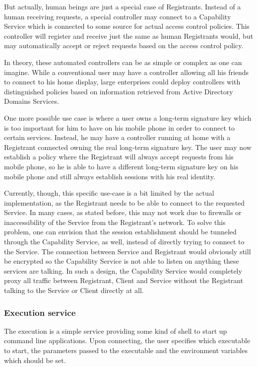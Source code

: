 But actually, human beings are just a special case of Registrants.
Instead of a human receiving requests, a special controller may connect to a Capability Service which is connected to some source for actual access control policies.
This controller will register and receive just the same as human Registrants would, but may automatically accept or reject requests based on the access control policy.

In theory, these automated controllers can be as simple or complex as one can imagine.
While a conventional user may have a controller allowing all his friends to connect to his home display, large enterprises could deploy controllers with distinguished policies based on information retrieved from Active Directory Domains Services.

One more possible use case is where a user owns a long-term signature key which is too important for him to have on his mobile phone in order to connect to certain services.
Instead, he may have a controller running at home with a Registrant connected owning the real long-term signature key.
The user may now establish a policy where the Registrant will always accept requests from his mobile phone, so he is able to have a different long-term signature key on his mobile phone and still always establish sessions with his real identity.

Currently, though, this specific use-case is a bit limited by the actual implementation, as the Registrant needs to be able to connect to the requested Service.
In many cases, as stated before, this may not work due to firewalls or inaccessibility of the Service from the Registrant's network.
To solve this problem, one can envision that the session establishment should be tunneled through the Capability Service, as well, instead of directly trying to connect to the Service.
The connection between Service and Registrant would obviously still be encrypted so the Capability Service is not able to listen on anything these services are talking.
In such a design, the Capability Service would completely proxy all traffic between Registrant, Client and Service without the Registrant talking to the Service or Client directly at all.

\subsubsection{Execution service}
\label{sec:exec-service}

The execution is a simple service providing some kind of shell to start up command line applications.
Upon connecting, the user specifies which executable to start, the parameters passed to the executable and the environment variables which should be set.

